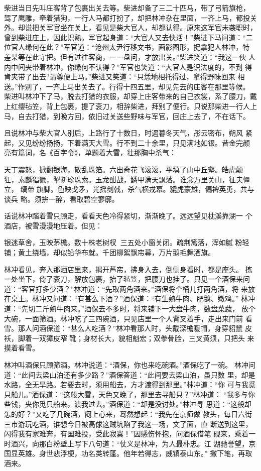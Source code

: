 柴进当日先叫庄客背了包裹出关去等。柴进却备了三二十匹马，带了弓箭旗枪，
驾了鹰雕，牵着猎狗，一行人马都打扮了，却把林冲杂在里面，一齐上马，都投关
外。却说把关军官坐在关上，看见是柴大官人，却都认得。原来这军官未袭职时，
曾到柴进庄上，因此识熟。军官起身道：“大官人又去快活！”柴进下马问道：“二
位官人缘何在此？”军官道：“沧州太尹行移文书，画影图形，捉拿犯人林冲，特
差某等在此守把。但有过往客商，一一盘问，才放出关。”柴进笑道：“我这一伙
人内中间夹带着林冲，你缘何不认得？”军官也笑道：“大官人是识法度的，不到
得肯夹带了出去?请尊便上马。”柴进又笑道：“只恁地相托得过，拿得野味回来
相送。”作别了，一齐上马出关去了。行得十四五里，却见先去的庄客在那里等候。
柴进叫林冲下了马，脱去打猎的衣服，却穿上庄客带来的自己衣裳，系了腰刀，戴
上红缨毡笠，背上包裹，提了衮刀，相辞柴进，拜别了便行。只说那柴进一行人上
马，自去打猎，到晚方回，依旧过关送些野味与军官，回庄上去了，不在话下。

且说林冲与柴大官人别后，上路行了十数日，时遇暮冬天气，彤云密布，朔风
紧起，又见纷纷扬扬，下着满天大雪。行不到二十余里，只见满地如银。昔金完颜
亮有篇词，名《百字令》，单题着大雪，壮那胸中杀气：

天丁震怒，掀翻银海，散乱珠箔。六出奇花飞滚滚，平填了山中丘壑。皓虎颠
狂，素麟猖獗，掣断珍珠索。玉龙酣战，鳞甲满天飘落。谁念万里关山，征夫僵立，
缟带旗脚。色映戈矛，光摇剑戟，杀气横戎幕。貔虎豪雄，偏裨英勇，共与谈兵
略。须拚一醉，看取碧空寥廓。

话说林冲踏着雪只顾走，看看天色冷得紧切，渐渐晚了。远远望见枕溪靠湖一
个酒店，被雪漫漫地压着。但见：

银迷草舍，玉映茅檐。数十株老树杈，三五处小窗关闭。疏荆篱落，浑如腻
粉轻铺；黄土绕墙，却似铅华布就。千团柳絮飘帘幕，万片鹅毛舞酒旗。

林冲看见，奔入那酒店里来，揭开芦帘，拂身入去，倒侧身看时，都是座头。
拣一处坐下，倚了衮刀，解放包裹，抬了毡笠，把腰刀也挂了。只见一个酒保来问
道：“客官打多少酒？”林冲道：“先取两角酒来。”酒保将个桶儿打两角酒，将
来放在桌上。林冲又问道：“有甚么下酒？”酒保道：“有生熟牛肉、肥鹅、嫩鸡。”
林冲道：“先切二斤熟牛肉来。”酒保去不多时，将来铺下一大盘牛肉，数盘菜蔬，
放个大碗，一面筛酒。林冲吃了三四碗酒，只见店里一个人背叉着手，走出来门前
看雪。那人问酒保道：“甚么人吃酒？”林冲看那人时，头戴深檐暖帽，身穿貂鼠
皮袄，脚着一双獐皮窄靴；身材长大，貌相魁宏；双拳骨脸，三叉黄须，只把头
来摸着看雪。

林冲叫酒保只顾筛酒。林冲说道：“酒保，你也来吃碗酒。”酒保吃了一碗。
林冲问道：“此间去梁山泊还有多少路？”酒保答道：“此间要去梁山泊，虽只数
里，却是水路，全无旱路。若要去时，须用船去，方才渡得到那里。”林冲道：“你
可与我觅只船儿。”酒保道：“这般大雪，天色又晚了，那里去寻船只？”林冲道：
“我多与你些钱，央你觅只船来，渡我过去。”酒保道：“却是没讨处。”林冲寻
思道：“这般却怎的好？”又吃了几碗酒，闷上心来，蓦然想起：“我先在京师做
教头，每日六街三市游玩吃酒，谁想今日被高俅这贼坑陷了我这一场，文了面，直
断送到这里，闪得我有家难奔，有国难投，受此寂寞！”因感伤怀抱，问酒保借笔
砚来，乘着一时酒兴，向那白粉壁上写下八句道：“仗义是林冲，为人最朴忠。江
湖驰誉望，京国显英雄。身世悲浮梗，功名类转蓬。他年若得志，威镇泰山东。”
撇下笔，再取酒来。

